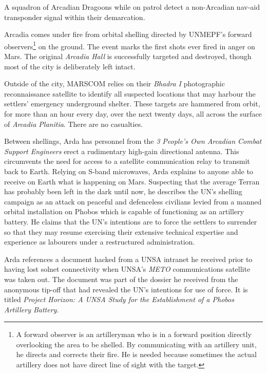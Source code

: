 

A squadron of Arcadian Dragoons while on patrol detect a non-Arcadian nav-aid transponder signal within their demarcation.
\StopTimelineDate

Arcadia comes under fire from orbital shelling directed by UNMEPF's forward observers\footnote{A forward observer is an artilleryman who is in a forward position directly overlooking the area to be shelled. By communicating with an artillery unit, he directs and corrects their fire. He is needed because sometimes the actual artillery does not have direct line of sight with the target.} on the ground. The event marks the first shots ever fired in anger on Mars. The original {\it Arcadia Hall} is successfully targeted and destroyed, though most of the city is deliberately left intact. 

Outside of the city, MARSCOM relies on their {\it Bhadra I} photographic reconnaissance satellite to identify all suspected locations that may harbour the settlers' emergency underground shelter. These targets are hammered from orbit, for more than an hour every day, over the next twenty days, all across the surface of {\it Arcadia Planitia}. There are no casualties.

Between shellings, Arda has personnel from the {\it 3 People's Own Arcadian Combat Support Engineers} erect a rudimentary high-gain directional antenna. This circumvents the need for access to a satellite communication relay to transmit back to Earth. Relying on S-band microwaves, Arda explains to anyone able to receive on Earth what is happening on Mars. Suspecting that the average Terran has probably been left in the dark until now, he describes the UN's shelling campaign as an attack on peaceful and defenceless civilians levied from a manned orbital installation on Phobos which is capable of functioning as an artillery battery. He claims that the UN's intentions are to force the settlers to surrender so that they may resume exercising their extensive technical expertise and experience as labourers under a restructured administration.

Arda references a document hacked from a UNSA intranet he received prior to having lost solnet connectivity when UNSA's {\it METO} communications satellite was taken out. The document was part of the dossier he received from the anonymous tip-off that had revealed the UN's intentions for use of force. It is titled {\it Project Horizon: A UNSA Study for the Establishment of a Phobos Artillery Battery}.

